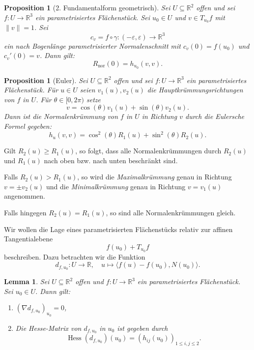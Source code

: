\documentclass[a4paper,12pt]{article}
\theoremstyle{break}
\newtheorem{proposition}[definition]{Proposition}
\newtheorem{lemma}[definition]{Lemma}
\begin{document}
\begin{proposition}[2. Fundamentalform geometrisch]
Sei \( U \subseteq \mathbb{R}^2 \) offen und sei \( f: U \to \mathbb{R}^3 \) ein parametrisiertes Flächenstück.  
Sei \( u_0 \in U \) und \( v \in T_{u_0} f \) mit \( \|v\| = 1 \).  
Sei  
\[
c_v = f \circ \gamma: (-\varepsilon, \varepsilon) \to \mathbb{R}^3
\]
ein nach Bogenlänge parametrisierter Normalenschnitt mit \( c_v(0) = f(u_0) \) und \( c_v'(0) = v \).  
Dann gilt:  
\[
R_{\operatorname{nor}}(0) = h_{u_0}(v,v).
\]
\end{proposition}

\begin{proposition}[Euler]
Sei \( U \subseteq \mathbb{R}^2 \) offen und sei \( f: U \to \mathbb{R}^3 \) ein parametrisiertes Flächenstück.  
Für \( u \in U \) seien \( v_1(u), v_2(u) \) die Hauptkrümmungsrichtungen von \( f \) in \( U \).  
Für \( \theta \in [0,2\pi) \) setze  
\[
v = \cos(\theta) v_1(u) + \sin(\theta) v_2(u).
\]
Dann ist die Normalenkrümmung von \( f \) in \( U \) in Richtung \( v \) durch die Eulersche Formel gegeben:  
\[
h_u(v,v) = \cos^2(\theta) R_1(u) + \sin^2(\theta) R_2(u).
\]
\end{proposition}

Gilt \( R_2(u) \geq R_1(u) \), so folgt, dass alle Normalenkrümmungen durch \( R_2(u) \) und \( R_1(u) \) nach oben bzw. nach unten beschränkt sind.  

Falls \( R_2(u) > R_1(u) \), so wird die \emph{Maximalkrümmung} genau in Richtung \( v = \pm v_2(u) \) und die \emph{Minimalkrümmung} genau in Richtung \( v = v_1(u) \) angenommen.  

Falls hingegen \( R_2(u) = R_1(u) \), so sind alle Normalenkrümmungen gleich.  

Wir wollen die Lage eines parametrisierten Flächenstücks relativ zur affinen Tangentialebene  
\[
f(u_0) + T_{u_0} f
\]
beschreiben. Dazu betrachten wir die Funktion  
\[
d_{f,u_0}: U \to \mathbb{R}, \quad u \mapsto \langle f(u) - f(u_0), N(u_0) \rangle.
\]

\begin{lemma}
Sei \( U \subseteq \mathbb{R}^2 \) offen und \( f: U \to \mathbb{R}^3 \) ein parametrisiertes Flächenstück. Sei \( u_0 \in U \). Dann gilt:  
\begin{enumerate}
    \item \( (\nabla d_{f,u_0})_{u_0} = 0 \),
    \item Die Hesse-Matrix von \( d_{f,u_0} \) in \( u_0 \) ist gegeben durch  
    \[
    \operatorname{Hess}(d_{f,u_0})(u_0) = (h_{ij}(u_0))_{1 \leq i,j \leq 2}.
    \]
\end{enumerate}
\end{lemma}
\end{document}
